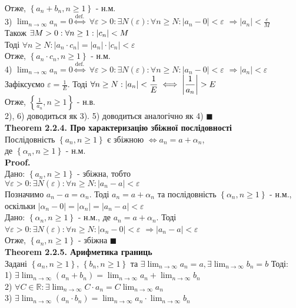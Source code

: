 \documentclass[a4paper, 14pt]{extarticle}
\def\huge{\displaystyle}
\def\bigline{\vspace{5mm}\\}
\def\bigline{\vspace{5mm}\\}
\def\qed{$\blacksquare$}
\def\sequence#1{$\displaystyle \left\{ {#1}, n\geq1 \right\}$}
\def\limitdef#1#2#3#4#5{$\displaystyle \forall #1 > 0: \exists #2(#1): \forall #3 \geq #2: \left|#4 - #5\right| < #1$}
\def\bounded#1#2#3{$\exists #1>0: \forall #2\geq1: \abs{#3} < #1$}
\begin{document}
	Отже, \sequence{a_n+b_n} - н.м.
	\bigline
	3) $\displaystyle \lim_{n \to \infty} a_n = 0 \overset{\textrm{def.}}{\iff}$ \limitdef{\varepsilon}{N}{n}{a_n}{0} $\Rightarrow \displaystyle |a_n| < \frac{\varepsilon}{M}$\\ 
	Також \bounded{M}{n}{c_n}\\
	Тоді $\forall n \geq N: |a_n \cdot c_n| = |a_n| \cdot |c_n| < \varepsilon$\\
	Отже, \sequence{a_n \cdot c_n} - н.м.
	\bigline
	4) $\displaystyle \lim_{n \to \infty} a_n = 0 \overset{\textrm{def.}}{\iff}$ \limitdef{\varepsilon}{N}{n}{a_n}{0} $\Rightarrow \displaystyle |a_n| < \varepsilon$\\
	Зафіксуємо $\displaystyle \varepsilon = \frac{1}{E}$. Тоді $\displaystyle \forall n \geq N: |a_n|<\frac{1}{E} \iff \abs{\frac{1}{a_n}} > E$\\
	Отже, \sequence{\frac{1}{a_n}} - н.в.\\
	2), 6) доводиться як 3). 5) доводиться аналогічно як 4) \qed
	\bigline
	\textbf{Theorem 2.2.4. Про характеризацію збіжної послідовності}\\
	Послідовність \sequence{a_n} є збіжною $\iff a_n=a+\alpha_n$, \\ де \sequence{\alpha_n} - н.м.\\
	\textbf{Proof.}\\
	\boxed{\Rightarrow} Дано: \sequence{a_n} - збіжна, тобто\\
	\limitdef{\varepsilon}{N}{n}{a_n}{a}\\
	Позначимо $a_n-a=\alpha_n$. Тоді $a_n=a+\alpha_n$ та послідовність \sequence{\alpha_n} - н.м., оскільки $|\alpha_n - 0| = |\alpha_n| = |a_n - a| < \varepsilon$
	\bigline
	\boxed{\Leftarrow} Дано: \sequence{\alpha_n} - н.м., де $a_n = a + \alpha_n$. Тоді\\
	\limitdef{\varepsilon}{N}{n}{\alpha_n}{0} $\Rightarrow |a_n-a|<\varepsilon$\\
	Отже, \sequence{a_n} - збіжна \qed
	\bigline
	\textbf{Theorem 2.2.5. Арифметика границь}\\
	Задані \sequence{a_n}, \sequence{b_n} та $\exists \huge \lim_{n \to \infty} a_n = a, \exists \huge \lim_{n \to \infty} b_n = b$ Тоді:\\
	1) $\displaystyle \exists \lim_{n \to \infty} (a_n+b_n) = \lim_{n \to \infty} a_n+\lim_{n \to \infty} b_n$\\
	2) $\displaystyle \forall C \in \mathbb{R}: \exists \lim_{n \to \infty} C \cdot a_n = C \lim_{n \to \infty} a_n$\\
	3) $\displaystyle \exists \lim_{n \to \infty} (a_n \cdot b_n) = \lim_{n \to \infty} a_n \cdot \lim_{n \to \infty} b_n$\\
\end{document}
